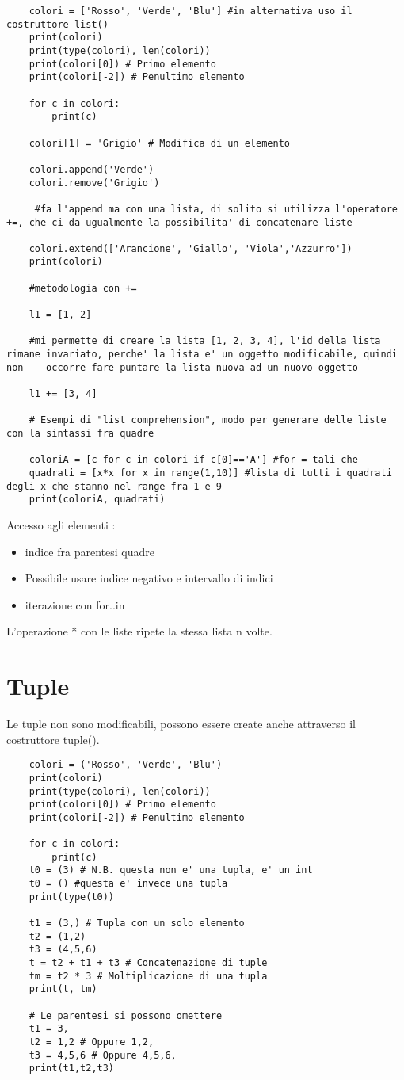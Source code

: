 \begin{lstlisting}
	colori = ['Rosso', 'Verde', 'Blu'] #in alternativa uso il costruttore list()
	print(colori)
	print(type(colori), len(colori))
	print(colori[0]) # Primo elemento
	print(colori[-2]) # Penultimo elemento
	
	for c in colori:
		print(c)
	
	colori[1] = 'Grigio' # Modifica di un elemento
	
	colori.append('Verde')
	colori.remove('Grigio')
	
	 #fa l'append ma con una lista, di solito si utilizza l'operatore +=, che ci da ugualmente la possibilita' di concatenare liste
	
	colori.extend(['Arancione', 'Giallo', 'Viola','Azzurro'])
	print(colori)

	#metodologia con +=
	
	l1 = [1, 2]
	
	#mi permette di creare la lista [1, 2, 3, 4], l'id della lista rimane invariato, perche' la lista e' un oggetto modificabile, quindi non	occorre fare puntare la lista nuova ad un nuovo oggetto
	
	l1 += [3, 4] 
	
	# Esempi di "list comprehension", modo per generare delle liste con la sintassi fra quadre
	
	coloriA = [c for c in colori if c[0]=='A'] #for = tali che
	quadrati = [x*x for x in range(1,10)] #lista di tutti i quadrati degli x che stanno nel range fra 1 e 9
	print(coloriA, quadrati)
\end{lstlisting}

Accesso agli elementi :
\begin{itemize}
	\item indice fra parentesi quadre
	\item Possibile usare indice negativo e intervallo di indici
	\item iterazione con for..in
\end{itemize}
L'operazione * con le liste ripete la stessa lista n volte.

\section{Tuple}

Le tuple non sono modificabili, possono essere create anche attraverso il costruttore tuple().

\begin{lstlisting}
	colori = ('Rosso', 'Verde', 'Blu')
	print(colori)
	print(type(colori), len(colori))
	print(colori[0]) # Primo elemento
	print(colori[-2]) # Penultimo elemento
	
	for c in colori:
		print(c)
	t0 = (3) # N.B. questa non e' una tupla, e' un int
	t0 = () #questa e' invece una tupla
	print(type(t0))
	
	t1 = (3,) # Tupla con un solo elemento
	t2 = (1,2)
	t3 = (4,5,6)
	t = t2 + t1 + t3 # Concatenazione di tuple
	tm = t2 * 3 # Moltiplicazione di una tupla
	print(t, tm)
	
	# Le parentesi si possono omettere
	t1 = 3,
	t2 = 1,2 # Oppure 1,2,
	t3 = 4,5,6 # Oppure 4,5,6,
	print(t1,t2,t3)
\end{lstlisting}

